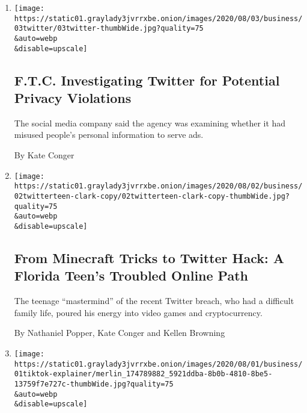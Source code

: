 \begin{enumerate}
\def\labelenumi{\arabic{enumi}.}
\item
  \href{/2020/08/03/technology/ftc-twitter-privacy-violations.html}{}

  \texttt{[image: https://static01.graylady3jvrrxbe.onion/images/2020/08/03/business/03twitter/03twitter-thumbWide.jpg?quality=75\\\&auto=webp\\\&disable=upscale]}

  \hypertarget{ftc-investigating-twitter-for-potential-privacy-violations}{%
  \subsection{F.T.C. Investigating Twitter for Potential Privacy
  Violations}\label{ftc-investigating-twitter-for-potential-privacy-violations}}

  The social media company said the agency was examining whether it had
  misused people's personal information to serve ads.

  By Kate Conger
\item
  \href{/2020/08/02/technology/florida-teenager-twitter-hack.html}{}

  \texttt{[image: https://static01.graylady3jvrrxbe.onion/images/2020/08/02/business/02twitterteen-clark-copy/02twitterteen-clark-copy-thumbWide.jpg?quality=75\\\&auto=webp\\\&disable=upscale]}

  \hypertarget{from-minecraft-tricks-to-twitter-hack-a-florida-teens-troubled-online-path}{%
  \subsection{From Minecraft Tricks to Twitter Hack: A Florida Teen's
  Troubled Online
  Path}\label{from-minecraft-tricks-to-twitter-hack-a-florida-teens-troubled-online-path}}

  The teenage ``mastermind'' of the recent Twitter breach, who had a
  difficult family life, poured his energy into video games and
  cryptocurrency.

  By Nathaniel Popper, Kate Conger and Kellen Browning
\item
  \href{/2020/08/01/technology/tiktok-trump-microsoft-bytedance-china-ban.html}{}

  \texttt{[image: https://static01.graylady3jvrrxbe.onion/images/2020/08/01/business/01tiktok-explainer/merlin\_174789882\_5921ddba-8b0b-4810-8be5-13759f7e727c-thumbWide.jpg?quality=75\\\&auto=webp\\\&disable=upscale]}

  \hypertarget{whats-going-on-with-tiktok-heres-what-we-know}{%
}
\end{enumerate}
